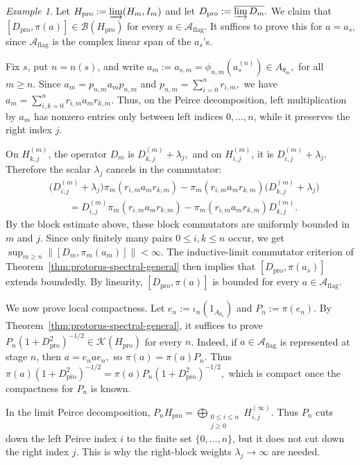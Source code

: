 \documentclass[11pt]{amsart}
\theoremstyle{definition}
\theoremstyle{remark}
\newtheorem{example}[theorem]{Example}
\newcommand{\ex}{\mathrm{pro}}
\begin{document}
\begin{example}
Let $H_{\ex}:=\varinjlim(H_m,I_m)$
and let $D_{\ex}:=\overline{\varinjlim D_m}.$
We claim that $
[D_{\ex},\pi(a)]\in\mathcal B(H_{\ex})$
for every $a\in\mathcal A_{\mathrm{flag}}$. It suffices to prove this for
$a=a_s$, since $\mathcal A_{\mathrm{flag}}$ is the complex linear span of
the $a_s$'s.

Fix $s$, put $n=n(s)$, and write $a_m:=a_{s,m}=\phi_{n,m}(a_s^{(n)})\in A_{\theta_m},$ for all
$m\geq n.$ Since $a_m=p_{n,m}a_mp_{n,m}$
and $p_{n,m}=\sum_{i=0}^{n}r_{i,m},$
we have $a_m=\sum_{i,k=0}^{n} r_{i,m}a_mr_{k,m}.$
Thus, on the Peirce decomposition, left multiplication by $a_m$ has nonzero
entries only between left indices $0,\ldots,n$, while it preserves the right
index $j$.

On $H_{k,j}^{(m)}$, the operator $D_m$ is $D_{k,j}^{(m)}+\lambda_j,$
and on $H_{i,j}^{(m)}$, it is $D_{i,j}^{(m)}+\lambda_j.$
Therefore the scalar $\lambda_j$ cancels in the commutator:
\[
\begin{aligned}
&
\bigl(D_{i,j}^{(m)}+\lambda_j\bigr)
\pi_m(r_{i,m}a_mr_{k,m})
-
\pi_m(r_{i,m}a_mr_{k,m})
\bigl(D_{k,j}^{(m)}+\lambda_j\bigr)
\\
&\qquad =
D_{i,j}^{(m)}\pi_m(r_{i,m}a_mr_{k,m})
-
\pi_m(r_{i,m}a_mr_{k,m})D_{k,j}^{(m)}.
\end{aligned}
\]
By the block estimate above, these block commutators are uniformly bounded in
$m$ and $j$. Since only finitely many pairs $0\leq i,k\leq n$ occur, we
get $\sup_{m\geq n}
\left\|
[D_m,\pi_m(a_m)]
\right\|
<\infty.$
The inductive-limit commutator criterion of Theorem~\ref{thm:protorus-spectral-general} then implies that
$[D_{\ex},\pi(a_s)]$
extends boundedly. By linearity, $[D_{\ex},\pi(a)]$ is bounded for every
$a\in\mathcal A_{\mathrm{flag}}$.

We now prove local compactness. Let $e_n:=\iota_n(1_{A_{\theta_n}})$ and
$P_n:=\pi(e_n)$.
By Theorem~\ref{thm:protorus-spectral-general}, it suffices to prove $P_n(1+D_{\ex}^2)^{-1/2}\in\mathcal K(H_{\ex})$
for every $n$. Indeed, if $a\in\mathcal A_{\mathrm{flag}}$ is represented
at stage $n$, then $a=e_nae_n,$
so $\pi(a)=\pi(a)P_n.$
Thus $\pi(a)(1+D_{\ex}^2)^{-1/2}
=
\pi(a)P_n(1+D_{\ex}^2)^{-1/2},$ which is compact once the compactness for $P_n$ is known.

In the limit Peirce decomposition, $P_nH_{\ex}=\bigoplus_{\substack{0\leq i\leq n\\ j\geq0}}H_{i,j}^{(\infty)}.$
Thus $P_n$ cuts down the left Peirce index $i$ to the finite set
$\{0,\ldots,n\}$, but it does not cut down the right index $j$. This is why
the right-block weights $\lambda_j\to\infty$ are needed.


\end{example}
\end{document}

